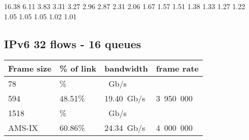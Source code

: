   16.38%
   6.11%
   3.83%
   3.31%
   3.27%
   2.96%
   2.87%
   2.31%
   2.06%
   1.67%
   1.57%
   1.51%
   1.38%
   1.33%
   1.27%
   1.22%
   1.05%
   1.05%
   1.05%
   1.02%
   1.01%



\subsection{IPv6 32 flows - 16 queues}
\begin{tabular}{ | l | l | l | l | }
\hline
Frame size & \% of link & bandwidth & frame rate \\
\hline
78     &   \% &  ~Gb/s &  \\
594    &  48.51\% & 19.40~Gb/s & 3~950~000 \\ %
1518   &  \% & ~Gb/s &  \\
AMS-IX &  60.86\% & 24.34~Gb/s & 4~000~000 \\ %
\hline
\end{tabular}







